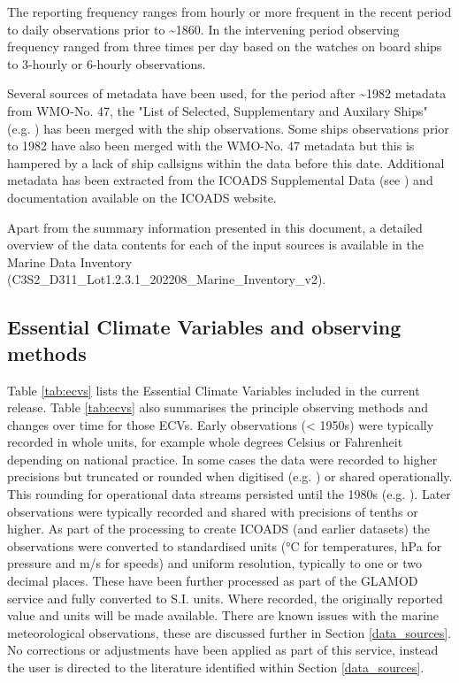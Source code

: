 The reporting frequency ranges from hourly or more frequent in the recent period to daily observations prior to \sim 1860. 
In the intervening period observing frequency ranged from three times per day based on the watches on board ships to 3-hourly or 6-hourly observations.

Several sources of metadata have been used, for the period after \sim 1982 metadata from WMO-No. 47, the "List of Selected, Supplementary and Auxilary Ships" (e.g. \cite{Kent2007}) has been merged with the ship observations.
Some ships observations prior to 1982 have also been merged with the WMO-No. 47 metadata but this is hampered by a lack of ship callsigns within the data before this date.
Additional metadata has been extracted from the ICOADS Supplemental Data (see \cite{Freeman2017}) and documentation available on the ICOADS website.

Apart from the summary information presented in this document, a detailed overview of the data contents for each of the input sources is available in the Marine Data Inventory \\
(C3S2\_D311\_Lot1.2.3.1\_202208\_Marine\_Inventory\_v2).

\subsection{Essential Climate Variables and observing methods}

Table \ref{tab:ecvs} lists the Essential Climate Variables included in the current release. 
Table \ref{tab:ecvs} also summarises the principle observing methods and changes over time for those ECVs.
Early observations (< 1950s) were typically recorded in whole units, for example whole degrees Celsius or Fahrenheit depending on national practice.
In some cases the data were recorded to higher precisions but truncated or rounded when digitised (e.g. \cite{Chan2019}) or shared operationally. 
This rounding for operational data streams persisted until the 1980s (e.g. \cite{Willett2008}).
Later observations were typically recorded and shared with precisions of tenths or higher.
As part of the processing to create ICOADS (and earlier datasets) the observations were converted to standardised units (°C for temperatures, hPa for pressure and m/s for speeds) and uniform resolution, typically to one or two decimal places.
These have been further processed as part of the GLAMOD service and fully converted to S.I. units.
Where recorded, the originally reported value and units will be made available.
There are known issues with the marine meteorological observations, these are discussed further in Section \ref{data_sources}.
No corrections or adjustments have been applied as part of this service, instead the user is directed to the literature identified within Section \ref{data_sources}.

